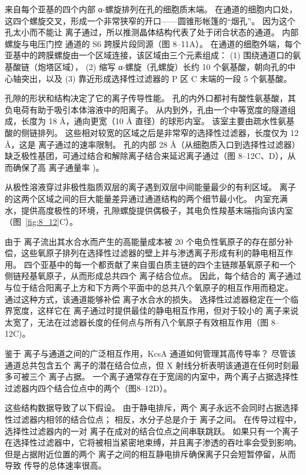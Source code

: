 来自每个亚基的四个内部 α-螺旋排列在孔的细胞质末端。
在通道的细胞内口处，这四个螺旋交叉，形成一个非常狭窄的开口——圆锥形帐篷的“烟孔”。
因为这个孔太小而不能让  离子通过，所以推测晶体结构代表了处于闭合状态的通道。
内部螺旋与电压门控  通道的 S6 跨膜片段同源（图 8–11A）。
在通道的细胞外端，每个亚基中的跨膜螺旋由一个区域连接，该区域由三个元素组成：
(1) 围绕通道口的氨基酸链（炮塔区域），
(2) 缩写 α-螺旋（孔螺旋）长约 10 个氨基酸，朝向孔的中心轴突出，以及
(3) 靠近形成选择性过滤器的 P 区 C 末端的一段 5 个氨基酸。


孔隙的形状和结构决定了它的离子传导性能。
孔的内外口都衬有酸性氨基酸，其负电荷有助于吸引本体溶液中的阳离子。
从内到外，孔由一个中等宽度的隧道组成，长度为 18 Å，通向更宽（10 Å 直径）的球形内室。
该室主要由疏水性氨基酸的侧链排列。
这些相对较宽的区域之后是非常窄的选择性过滤器，长度仅为 12 Å，这是  离子通过的速率限制。
孔的内部 28 Å（从细胞质入口到选择性过滤器）缺乏极性基团，可通过结合和解除离子结合来延迟离子通过（图 8–12C、D），从而确保了高  离子通量率 )。


从极性溶液穿过非极性脂质双层的离子遇到双层中间能量最少的有利区域。
 离子的这两个区域之间的巨大能量差异通过通道结构的两个细节最小化。
内室充满水，提供高度极性的环境，孔隙螺旋提供偶极子，其电负性羧基末端指向该内室（图~\ref{fig:8_12}C）。


由于  离子流出其水合水而产生的高能量成本被 20 个电负性氧原子的存在部分补偿，这些氧原子排列在选择性过滤器的壁上并与渗透离子形成有利的静电相互作用。 
四个亚基中的每一个都贡献了来自蛋白质主链的四个主链羰基氧原子和一个侧链羟基氧原子，从而形成总共四个  离子结合位点。
因此，每个结合的  离子通过与位于结合阳离子上方和下方两个平面中的总共八个氧原子的相互作用而稳定。 
通过这种方式，该通道能够补偿  离子水合水的损失。
选择性过滤器稳定在一个临界宽度，这样它在  离子通过时提供最佳的静电相互作用，但对于较小的  离子来说太宽了，无法在过滤器长度的任何点与所有八个氧原子有效相互作用（图 8–12C)。


鉴于  离子与通道之间的广泛相互作用，KcsA 通道如何管理其高传导率？
尽管该通道总共包含五个  离子的潜在结合位点，但 X 射线分析表明该通道在任何时刻最多可被三个  离子占据。
一个离子通常存在于宽阔的内室中，两个离子占据选择性过滤器内四个结合位点中的两个（图8–12D）。


这些结构数据导致了以下假设。
由于静电排斥，两个  离子永远不会同时占据选择性过滤器内相邻的结合位点；
相反，水分子总是介于  离子之间。
在传导过程中，选择性过滤器内的一对  离子在成对的结合位点之间串联跳跃。
如果只有一个离子在选择性过滤器中，它将被相当紧密地束缚，并且离子渗透的吞吐率会受到影响。
但是占据附近位置的两个  离子之间的相互静电排斥确保离子只会短暂停留，从而导致  传导的总体速率很高。


